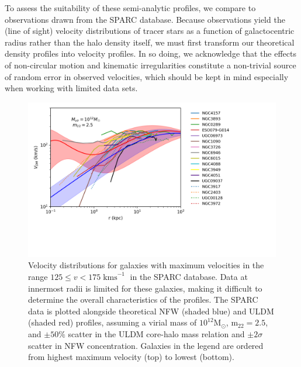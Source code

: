 \documentclass{pasa}%
\begin{document}
To assess the suitability of these semi-analytic profiles, we compare to observations drawn from the SPARC database. Because observations yield the (line of sight) velocity distributions of tracer stars as a function of galactocentric radius rather than the halo density itself, we must first transform our theoretical density profiles into velocity profiles. In so doing, we acknowledge that the effects of non-circular motion and kinematic irregularities constitute a non-trivial source of random error in observed velocities, which should be kept in mind especially when working with limited data sets. 


\begin{figure}[t]
\centering
\includegraphics[scale=0.9, trim={0cm 2.5cm 3cm 0cm}]{000_vs_SPARC_10_12.png}
\caption{Velocity distributions for galaxies with maximum velocities in the range $125 \leq v < 175\operatorname{kms}^{-1}$ in the SPARC database. Data at innermost radii is limited for these galaxies, making it difficult to determine the overall characteristics of the profiles. The SPARC data is plotted alongside theoretical NFW (shaded blue) and ULDM (shaded red) profiles, assuming a virial mass of $10^{12} \mathrm{M}_{\odot}$, $\mathrm{m_{22}} = 2.5$, and $\pm 50 \%$ scatter in the ULDM core-halo mass relation and $\pm2\sigma$ scatter in NFW concentration. Galaxies in the legend are ordered from highest maximum velocity (top) to lowest (bottom).}\label{fig:high_v} 
\end{figure}
\end{document}
